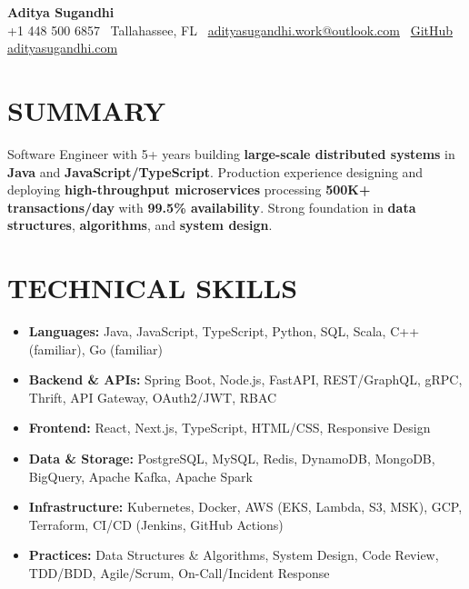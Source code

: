 \documentclass[letterpaper,10pt]{article}
\newcommand{\resumeItem}[1]{\item\small #1}
\begin{document}
\begin{center}
{\huge\textbf{Aditya Sugandhi}} \\
+1 448 500 6857 \textbar\ \textcolor{metablue}{Tallahassee, FL} \textbar\
\href{mailto:adityasugandhi.work@outlook.com}{adityasugandhi.work@outlook.com} \textbar\
\href{https://github.com/adityasugandhi}{GitHub}
\textbar \href{https://adityasugandhi.com}{adityasugandhi.com}
\end{center}
\vspace{-12pt}

\section{\textcolor{metablue}{SUMMARY}}
\small
\vspace{-6pt}
Software Engineer with 5+ years building \textbf{large-scale distributed systems} in \textbf{Java} and \textbf{JavaScript/TypeScript}. Production experience designing and deploying \textbf{high-throughput microservices} processing \textbf{500K+ transactions/day} with \textbf{99.5\% availability}. Strong foundation in \textbf{data structures}, \textbf{algorithms}, and \textbf{system design}.

\vspace{-9pt}

\section{\textcolor{metablue}{TECHNICAL SKILLS}}
\vspace{-5pt}
\small
\begin{itemize}
\resumeItem{\textbf{Languages:} Java, JavaScript, TypeScript, Python, SQL, Scala, C++ (familiar), Go (familiar)}
\resumeItem{\textbf{Backend \& APIs:} Spring Boot, Node.js, FastAPI, REST/GraphQL, gRPC, Thrift, API Gateway, OAuth2/JWT, RBAC}
\resumeItem{\textbf{Frontend:} React, Next.js, TypeScript, HTML/CSS, Responsive Design}
\resumeItem{\textbf{Data \& Storage:} PostgreSQL, MySQL, Redis, DynamoDB, MongoDB, BigQuery, Apache Kafka, Apache Spark}
\resumeItem{\textbf{Infrastructure:} Kubernetes, Docker, AWS (EKS, Lambda, S3, MSK), GCP, Terraform, CI/CD (Jenkins, GitHub Actions)}
\resumeItem{\textbf{Practices:} Data Structures \& Algorithms, System Design, Code Review, TDD/BDD, Agile/Scrum, On-Call/Incident Response}
\end{itemize}
\vspace{-10pt}
\end{document}

